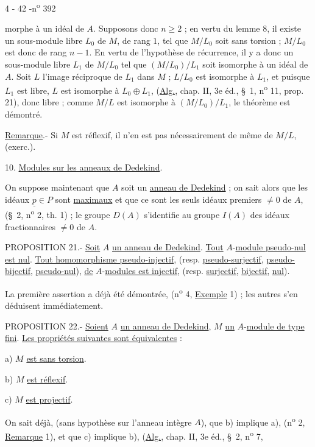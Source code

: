 \begin{center}4 - 42 -\hfill n\textsuperscript{o} 392\end{center}

morphe à un idéal de $A$. Supposons donc $n\geq 2$ ; en vertu du lemme 8, il existe un sous-module libre $L_0$ de $M$, de rang $1$, tel que $M/L_0$ soit sans torsion ; $M/L_0$ est donc de rang $n-1$. En vertu de l'hypothèse de récurrence, il y a donc un sous-module libre $L_1$ de $M/L_0$ tel que $(M/L_0)/L_1$ soit isomorphe à un idéal de $A$. Soit $L$ l'image réciproque de $L_1$ dans $M$ ; $L/L_0$ est isomorphe à $L_1$, et puisque $L_1$ est libre, $L$ est isomorphe à $L_0\oplus L_1$, (\uline{Alg.}, chap. II, 3e éd., \S\ 1, n\textsuperscript{o} 11, prop. 21), donc libre ; comme $M/L$ est isomorphe à $(M/L_0)/L_1$, le théorème est démontré.

\uline{Remarque}.- Si $M$ est réflexif, il n'en est pas nécessairement de même de $M/L$, (exerc.\quad).

10. \uline{Modules sur les anneaux de Dedekind}.

On suppose maintenant que $A$ soit un \uline{anneau de Dedekind} ; on sait alors que les idéaux $\underline{p}\in P$ sont \uline{maximaux} et que ce sont les seuls idéaux premiers $\ne 0$ de $A$, (\S\ 2, n\textsuperscript{o} 2, th. 1) ; le groupe $D(A)$ s'identifie au groupe $I(A)$ des idéaux fractionnaires $\ne 0$ de $A$.

PROPOSITION 21.- \uline{Soit} $A$ \uline{un anneau de Dedekind}. \uline{Tout} $A$-\uline{module pseudo-nul est nul}. \uline{Tout homomorphisme pseudo-injectif}, (resp. \uline{pseudo-surjectif}, \uline{pseudo-bijectif}, \uline{pseudo-nul}), \uline{de} $A$-\uline{modules est injectif}, (resp. \uline{surjectif}, \uline{bijectif}, \uline{nul}).

La première assertion a déjà été démontrée, (n\textsuperscript{o} 4, \uline{Exemple} 1) ; les autres s'en déduisent immédiatement.

PROPOSITION 22.- \uline{Soient} $A$ \uline{un anneau de Dedekind}, $M$ \uline{un} $A$-\uline{module de type fini}. \uline{Les propriétés suivantes sont équivalentes} :

a) $M$ \uline{est sans torsion}.

b) $M$ \uline{est réflexif}.

c) $M$ \uline{est projectif}.

On sait déjà, (sans hypothèse sur l'anneau intègre $A$), que b) implique a), (n\textsuperscript{o} 2, \uline{Remarque} 1), et que c) implique b), (\uline{Alg.}, chap. II, 3e éd., \S\ 2, n\textsuperscript{o} 7,


